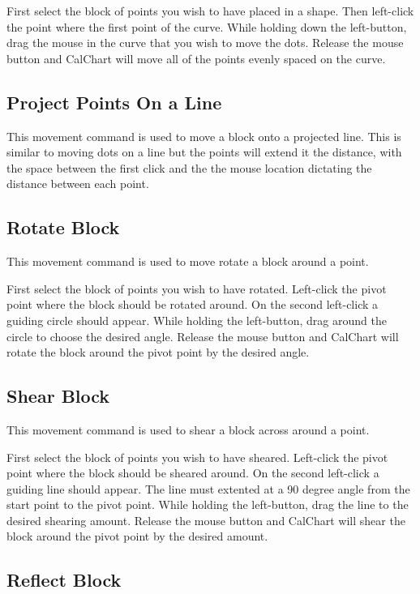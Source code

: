 First select the block of points you wish to have placed in a shape.  Then left-click the point where the first point of the curve.  While holding down the left-button, drag the mouse in the curve that you wish to move the dots.  Release the mouse button and CalChart will move all of the points evenly spaced on the curve.

\subsection{Project Points On a Line}\label{projectpointsonaline}

This movement command is used to move a block onto a projected line.  This is similar to moving dots on a line but the points will extend it the distance, with the space between the first click and the the mouse location dictating the distance between each point.

\subsection{Rotate Block}\label{rotateblock}

This movement command is used to move rotate a block around a point.

First select the block of points you wish to have rotated.  Left-click the pivot point where the block should be rotated around.  On the second left-click a guiding circle should appear.  While holding the left-button, drag around the circle to choose the desired angle.  Release the mouse button and CalChart will rotate the block around the pivot point by the desired angle.

\subsection{Shear Block}\label{shearblock}

This movement command is used to shear a block across around a point.

First select the block of points you wish to have sheared.  Left-click the pivot point where the block should be sheared around.  On the second left-click a guiding line should appear.  The line must extented at a 90 degree angle from the start point to the pivot point.   While holding the left-button, drag the line to the desired shearing amount.  Release the mouse button and CalChart will shear the block around the pivot point by the desired amount.

\subsection{Reflect Block}\label{reflectblock}

